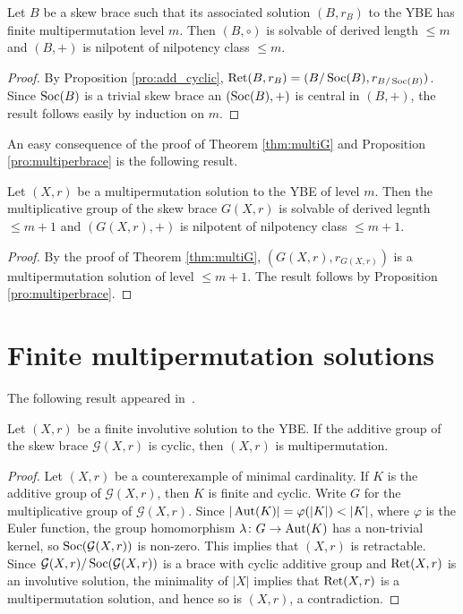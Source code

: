 \begin{proposition}\label{pro:multiperbrace}
Let $B$ be a skew brace such that its associated solution $(B,r_B)$ to the YBE has finite multipermutation level $m$.
Then $(B,\circ)$ is solvable of derived length $\leq m$ and $(B,+)$ is nilpotent of nilpotency class $\leq m$.
\end{proposition}

\begin{proof}
By Proposition \ref{pro:add_cyclic}, $\operatorname{Ret}(B,r_B)=(B/\operatorname{Soc}(B),r_{B/\operatorname{Soc}(B)})$. Since $\operatorname{Soc}(B)$ is a trivial skew brace an $(\operatorname{Soc}(B),+)$ is central in $(B,+)$, the result follows easily by induction on $m$.
\end{proof}    
An easy consequence of the proof of Theorem \ref{thm:multiG} and Proposition \ref{pro:multiperbrace} is the following result.

\begin{theorem}
    Let $(X,r)$ be a multipermutation solution to the YBE of level $m$. Then the multiplicative group of the skew brace $G(X,r)$ is solvable of derived legnth $\leq m+1$ and $(G(X,r),+)$ is nilpotent of nilpotency class $\leq m+1$.
\end{theorem}

\begin{proof}
  By the proof of Theorem \ref{thm:multiG}, $\left( G(X,r),r_{G(X,r)}\right)$ is a multipermutation solution of level $\leq m+1$. The result follows by Proposition \ref{pro:multiperbrace}.
\end{proof}

\section{Finite multipermutation solutions} 

The following result appeared in~\cite{MR1722951}.

\begin{proposition}
Let $(X,r)$ be a finite involutive solution to the YBE. If the additive group 
of the skew brace $\mathcal{G}(X,r)$ is cyclic, then $(X,r)$ 
is multipermutation.
\end{proposition}

\begin{proof}
    Let $(X,r)$ be a counterexample of minimal cardinality. If $K$ is the additive 
    group of $\mathcal{G}(X,r)$, then $K$ is finite and cyclic. 
    Write $G$ for the multiplicative group of $\mathcal{G}(X,r)$. 
    Since $|\Aut(K)|=\varphi(|K|)<|K|$, where $\varphi$ is the Euler function, 
    the group homomorphism $\lambda\colon G\to\operatorname{Aut}(K)$ 
    has a non-trivial kernel, so $\operatorname{Soc}(\mathcal{G}(X,r))$ is non-zero.  
    This implies that $(X,r)$ is retractable. 
    Since $\mathcal{G}(X,r)/\operatorname{Soc}(\mathcal{G}(X,r))$ is a brace with cyclic 
    additive group and $\operatorname{Ret}(X,r)$ is an involutive solution, the 
    minimality of $|X|$ implies that 
    $\operatorname{Ret}(X,r)$ is a multipermutation solution, and hence so is $(X,r)$, 
    a contradiction. 
\end{proof}

